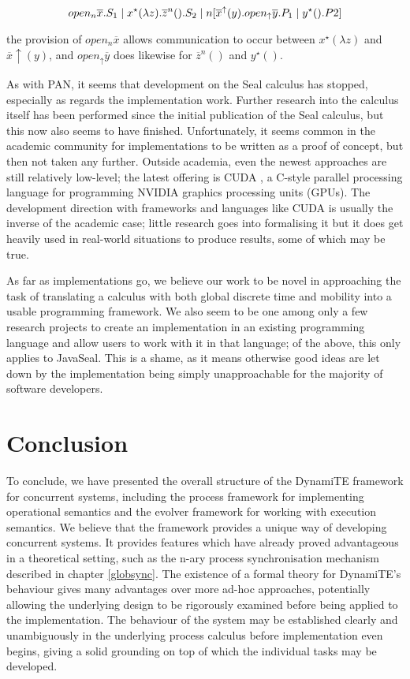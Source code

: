\begin{equation}
  open_n \overline{x}.S_1 \;|\; x^\star(\lambda z).\overline{z}^n().S_2 \;|\; 
  n[\overline{x}^\uparrow(y).open_\uparrow \overline{y}.P_1 \;|\; y^\star ().P2]
\end{equation}

\noindent the provision of $open_n \overline{x}$ allows communication
to occur between $x^\star(\lambda z)$ and $\overline{x}\uparrow(y)$,
and $open_\uparrow \overline{y}$ does likewise for $\overline{z}^n()$
and $y^\star ()$.

  As with PAN, it seems that development on the Seal calculus has
  stopped, especially as regards the implementation work.  Further
  research into the calculus itself has been performed
  \cite{seal01,seal02} since the initial publication of the Seal
  calculus, but this now also seems to have finished.  Unfortunately,
  it seems common in the academic community for implementations to be
  written as a proof of concept, but then not taken any further.
  Outside academia, even the newest approaches are still relatively
  low-level; the latest offering is CUDA \cite{cuda}, a C-style
  parallel processing language for programming NVIDIA graphics
  processing units (GPUs).  The development direction with frameworks
  and languages like CUDA is usually the inverse of the academic case;
  little research goes into formalising it but it does get heavily
  used in real-world situations to produce results, some of which may
  be true.

As far as implementations go, we believe our work to be novel in
approaching the task of translating a calculus with both global
discrete time and mobility into a usable programming framework.  We
also seem to be one among only a few research projects to create an
implementation in an existing programming language and allow users to
work with it in that language; of the above, this only applies to
JavaSeal.  This is a shame, as it means otherwise good ideas are let
down by the implementation being simply unapproachable for the
majority of software developers.

\section{Conclusion}

To conclude, we have presented the overall structure of the DynamiTE
framework for concurrent systems, including the process framework for
implementing operational semantics and the evolver framework for
working with execution semantics.  We believe that the framework
provides a unique way of developing concurrent systems.  It provides
features which have already proved advantageous in a theoretical
setting, such as the n-ary process synchronisation mechanism described
in chapter \ref{globsync}.  The existence of a formal theory for
DynamiTE's behaviour gives many advantages over more ad-hoc
approaches, potentially allowing the underlying design to be
rigorously examined before being applied to the implementation.  The
behaviour of the system may be established clearly and unambiguously
in the underlying process calculus before implementation even begins,
giving a solid grounding on top of which the individual tasks may be
developed.

